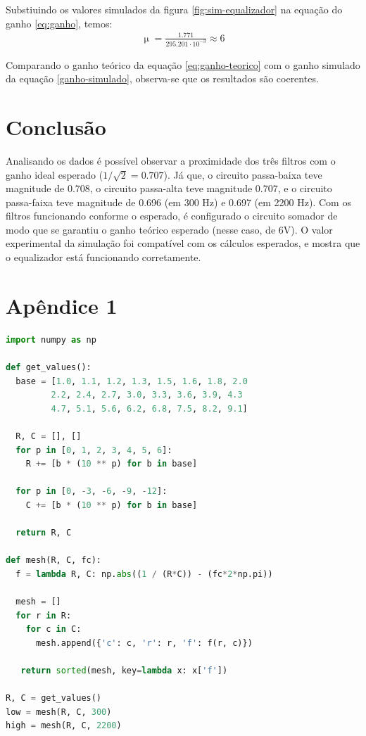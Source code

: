 \documentclass{article}
\begin{document}
Substiuindo os valores simulados da figura \ref{fig:sim-equalizador} na equação do ganho \eqref{eq:ganho}, temos:
\begin{align}
  \upmu = \frac{1.771}{295.201 \cdot 10^{-3}} \approx 6 \label{ganho-simulado}
\end{align}

Comparando o ganho teórico da equação \eqref{eq:ganho-teorico} com o ganho simulado da equação \eqref{ganho-simulado}, observa-se que os resultados são coerentes.

\section{Conclusão}
Analisando os dados é possível observar a proximidade dos três filtros com o ganho ideal esperado ($1/\sqrt{2} = 0.707$). Já que, o circuito passa-baixa teve magnitude de 0.708, o circuito passa-alta teve magnitude  0.707, e o circuito passa-faixa teve magnitude de 0.696 (em 300 Hz)  e  0.697 (em 2200 Hz).  Com os filtros funcionando conforme o esperado, é configurado o circuito somador de modo que se garantiu o ganho teórico esperado (nesse caso, de 6V). O valor experimental da simulação foi compatível com os cálculos esperados, e mostra que o equalizador está funcionando corretamente.

{}


\newpage

\section*{Apêndice 1}
\begin{lstlisting}[language=Python]
import numpy as np
 
def get_values():
  base = [1.0, 1.1, 1.2, 1.3, 1.5, 1.6, 1.8, 2.0
         2.2, 2.4, 2.7, 3.0, 3.3, 3.6, 3.9, 4.3
         4.7, 5.1, 5.6, 6.2, 6.8, 7.5, 8.2, 9.1]
 
  R, C = [], []
  for p in [0, 1, 2, 3, 4, 5, 6]:
    R += [b * (10 ** p) for b in base]

  for p in [0, -3, -6, -9, -12]:
    C += [b * (10 ** p) for b in base]
    
  return R, C
 
def mesh(R, C, fc):
  f = lambda R, C: np.abs((1 / (R*C)) - (fc*2*np.pi))
    
  mesh = []
  for r in R:
    for c in C:
      mesh.append({'c': c, 'r': r, 'f': f(r, c)})
 
   return sorted(mesh, key=lambda x: x['f'])

R, C = get_values()
low = mesh(R, C, 300)
high = mesh(R, C, 2200)
\end{lstlisting}
\end{document}
